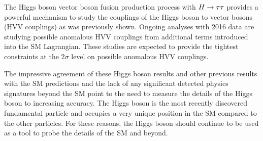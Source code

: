 The Higgs boson vector boson fusion production process with $H\to\tau\tau$ provides a 
powerful mechanism to study the couplings of the Higgs boson to vector bosons
(HVV couplings) as was previously shown. Ongoing analyses with 2016 data are studying possible
anomalous HVV couplings from additional terms introduced into the SM Lagrangian. 
These studies are expected to provide the tightest constraints at the 2$\sigma$ 
level on possible anomalous HVV couplings.

The impressive agreement of these Higgs boson results and other previous results
with the SM predictions and the lack of any significant detected physics signatures beyond
the SM point to the need to measure the details of the Higgs boson to increasing
accuracy. The Higgs boson is the most recently discovered fundamental particle and occupies a very
unique position in the SM compared to the other particles. For these reasons,
the Higgs boson should continue to be used as a tool to probe the details of the SM and beyond.




